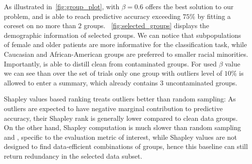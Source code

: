As illustrated in~\cref{fig:group_plot}, \bcores{} with $\beta=0.6$ offers the best solution to our problem, and is able to reach predictive accuracy exceeding $75\%$ by fitting a coreset on no more than $2$ groups. ~\cref{fig:selected_groups} displays the demographic information of selected groups. We can notice that subpopulations of female and older patients are more informative for the classification task, while Caucasian and African-American groups are preferred to smaller racial minorities. Importantly, \bcores{} is able to distill clean from contaminated groups. For used $\beta$ value we can see than over the set of trials only one group with outliers level of $10\%$ is allowed to enter a summary, which already contains $3$ uncontaminated groups.

Shapley values based ranking treats outliers better than random sampling: As outliers are expected to have negative marginal contribution to predictive accuracy, their Shapley rank is generally lower compared to clean data groups. On the other hand, Shapley computation is much slower than random sampling and \bcores, specific to the evaluation metric of interest, while Shapley values are not designed to find data-efficient combinations of groups, hence this baseline can still return redundancy in the selected data subset.








